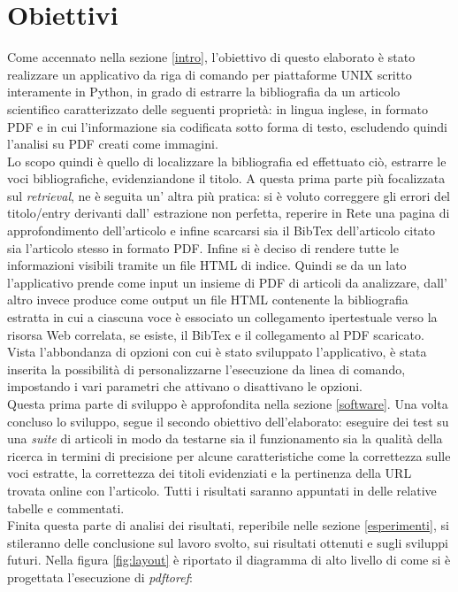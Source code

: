 \section{Obiettivi} 
\label{obiettivi}
Come accennato nella sezione \ref{intro}, l'obiettivo di questo elaborato è stato realizzare un applicativo da riga di comando per piattaforme UNIX scritto interamente in Python, in grado di estrarre la bibliografia da un articolo scientifico caratterizzato delle seguenti proprietà: in lingua inglese, in formato PDF e in cui l'informazione sia codificata sotto forma di testo, escludendo quindi l'analisi su PDF creati come immagini.\\ 
Lo scopo quindi è quello di localizzare la bibliografia ed effettuato ciò, estrarre le voci bibliografiche, evidenziandone il titolo. A questa prima parte più focalizzata sul \textit{retrieval}, ne è seguita un' altra più pratica: si è voluto correggere gli errori del titolo/entry derivanti dall' estrazione non perfetta, reperire in Rete una pagina di approfondimento dell'articolo e infine scarcarsi sia il BibTex dell'articolo citato sia l'articolo stesso in formato PDF. Infine si è deciso di rendere tutte le informazioni visibili tramite un file HTML di indice. Quindi se da un lato l'applicativo prende come input un insieme di PDF di articoli da analizzare, dall' altro invece produce come output un file HTML contenente la bibliografia estratta in cui a ciascuna voce è essociato un collegamento ipertestuale verso la risorsa Web correlata, se esiste, il BibTex e il collegamento al PDF scaricato.\\
Vista l'abbondanza di opzioni con cui è stato sviluppato l'applicativo, è stata inserita la possibilità di personalizzarne l'esecuzione da linea di comando, impostando i vari parametri che attivano o disattivano le opzioni.\\ Questa prima parte di sviluppo è approfondita nella sezione \ref{software}.
Una volta concluso lo sviluppo, segue il secondo obiettivo dell'elaborato: eseguire dei test su una \textit{suite} di articoli in modo da testarne sia il funzionamento sia la qualità della ricerca in termini di precisione per alcune caratteristiche come la correttezza sulle voci estratte, la correttezza dei titoli evidenziati e la pertinenza della URL trovata online con l'articolo. Tutti i risultati saranno appuntati in delle relative tabelle e commentati.\\
Finita questa parte di analisi dei risultati, reperibile nelle sezione \ref{esperimenti}, si stileranno delle conclusione sul lavoro svolto, sui risultati ottenuti e sugli sviluppi futuri. Nella figura \ref{fig:layout} è riportato il diagramma di alto livello di come si è progettata l'esecuzione di \textit{pdftoref}:

